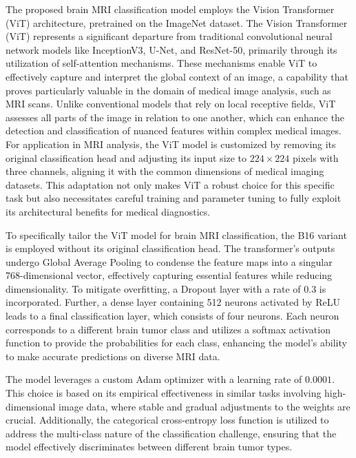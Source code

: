 The proposed brain MRI classification model employs the Vision Transformer (ViT) architecture, pretrained on the ImageNet dataset. The Vision Transformer (ViT) represents a significant departure from traditional convolutional neural network models like InceptionV3, U-Net, and ResNet-50, primarily through its utilization of self-attention mechanisms. These mechanisms enable ViT to effectively capture and interpret the global context of an image, a capability that proves particularly valuable in the domain of medical image analysis, such as MRI scans. Unlike conventional models that rely on local receptive fields, ViT assesses all parts of the image in relation to one another, which can enhance the detection and classification of nuanced features within complex medical images. For application in MRI analysis, the ViT model is customized by removing its original classification head and adjusting its input size to $224\times224$ pixels with three channels, aligning it with the common dimensions of medical imaging datasets. This adaptation not only makes ViT a robust choice for this specific task but also necessitates careful training and parameter tuning to fully exploit its architectural benefits for medical diagnostics.

To specifically tailor the ViT model for brain MRI classification, the B16 variant is employed without its original classification head. The transformer's outputs undergo Global Average Pooling to condense the feature maps into a singular 768-dimensional vector, effectively capturing essential features while reducing dimensionality. To mitigate overfitting, a Dropout layer with a rate of 0.3 is incorporated. Further, a dense layer containing 512 neurons activated by ReLU leads to a final classification layer, which consists of four neurons. Each neuron corresponds to a different brain tumor class and utilizes a softmax activation function to provide the probabilities for each class, enhancing the model's ability to make accurate predictions on diverse MRI data.

The model leverages a custom Adam optimizer with a learning rate of 
$0.0001$. This choice is based on its empirical effectiveness in similar tasks involving high-dimensional image data, where stable and gradual adjustments to the weights are crucial. Additionally, the categorical cross-entropy loss function is utilized to address the multi-class nature of the classification challenge, ensuring that the model effectively discriminates between different brain tumor types.

